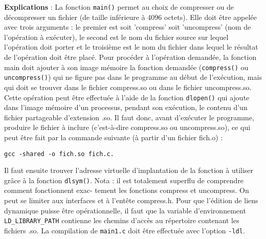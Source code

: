 \documentclass[a4paper,12pt]{article}
\begin{document}
\textbf{Explications} : La fonction \texttt{main()} permet au choix de compresser ou de
décompresser un fichier (de taille inférieure à 4096 octets).
Elle doit être appelée avec trois arguments : le premier est soit 'compress'
soit 'uncompress' (nom de l'opération à exécuter), le second est le nom du fichier
source sur lequel l'opération doit porter et le troisième est le nom du fichier
dans lequel le résultat de l'opération doit être placé.
Pour procéder à l'opération demandée, la fonction main doit ajouter à son
image mémoire la fonction demandée (\texttt{compress()} ou \texttt{uncompress()}) qui ne
figure pas dans le programme au début de l'exécution, mais qui doit se trouver
dans le fichier compress.so ou dans le fichier uncompress.so.
Cette opération peut être effectuée à l'aide de la fonction \texttt{dlopen()} qui
ajoute dans l'image mémoire d'un processus, pendant son exécution, le contenu
d'un fichier partageable d'extension .so. Il faut donc, avant d'exécuter le programme, 
produire le fichier à inclure (c'est-à-dire compress.so ou uncompress.so),
ce qui peut être fait par la commande suivante (à partir d'un fichier fich.o) :
\begin{verbatim}
gcc -shared -o fich.so fich.c.
\end{verbatim}
Il faut ensuite trouver l'adresse virtuelle d'implantation de la fonction à
utiliser grâce à la fonction \texttt{dlsym()}.
Nota : il est totalement superflu de comprendre comment fonctionnent exac-
tement les fonctions compress et uncompress. On peut se limiter aux interfaces
et à l'entête compress.h.
Pour que l'édition de liens dynamique puisse être opérationnelle, il faut que
la variable d'environnement \verb#LD_LIBRARY_PATH# contienne les chemins d'accès
au répertoire contenant les fichiers .so. La compilation de \texttt{main1.c} doit être
effectuée avec l'option \texttt{-ldl}.

\begin{comment}
Correction :
Les lignes complétées sont (dans l'ordre) :
operation(buffer_in, length_in, buffer_out, &length_out);
write(out, buffer_out, sizeof(UBYTE)*length_out);
sprintf(partageable, "%
if ((so_handle = dlopen(partageable,RTLD_LAZY)) == NULL)
dlsym(so_handle, function);
operation = loader(argv[1]);
treatment(argv[2], argv[3]);
dlopen() permet d'ouvrir la bibliothèque dynamique. RTLD_LAZY indique que les
symboles doivent être résolus quand c'est nécessaire (et non pas immédiatement).
dlsym() cherche un symbole dans une bibliothèque dynamique ouverte. 
\end{comment}
\end{document}

